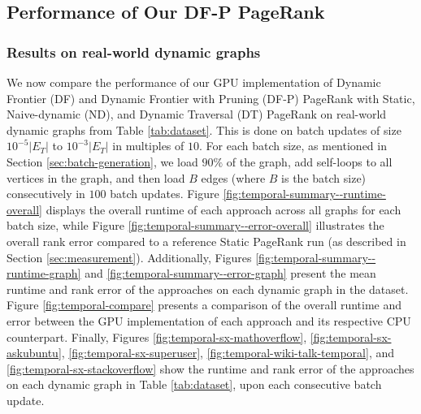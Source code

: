 \subsection{Performance of Our DF-P PageRank}

\subsubsection{Results on real-world dynamic graphs}

We now compare the performance of our GPU implementation of Dynamic Frontier (DF) and Dynamic Frontier with Pruning (DF-P) PageRank with Static, Naive-dynamic (ND), and Dynamic Traversal (DT) PageRank on real-world dynamic graphs from Table \ref{tab:dataset}. This is done on batch updates of size $10^{-5}|E_T|$ to $10^{-3}|E_T|$ in multiples of $10$. For each batch size, as mentioned in Section \ref{sec:batch-generation}, we load $90\%$ of the graph, add self-loops to all vertices in the graph, and then load $B$ edges (where $B$ is the batch size) consecutively in $100$ batch updates. Figure \ref{fig:temporal-summary--runtime-overall} displays the overall runtime of each approach across all graphs for each batch size, while Figure \ref{fig:temporal-summary--error-overall} illustrates the overall rank error compared to a reference Static PageRank run (as described in Section \ref{sec:measurement}). Additionally, Figures \ref{fig:temporal-summary--runtime-graph} and \ref{fig:temporal-summary--error-graph} present the mean runtime and rank error of the approaches on each dynamic graph in the dataset. Figure \ref{fig:temporal-compare} presents a comparison of the overall runtime and error between the GPU implementation of each approach and its respective CPU counterpart. Finally, Figures \ref{fig:temporal-sx-mathoverflow}, \ref{fig:temporal-sx-askubuntu}, \ref{fig:temporal-sx-superuser}, \ref{fig:temporal-wiki-talk-temporal}, and \ref{fig:temporal-sx-stackoverflow} show the runtime and rank error of the approaches on each dynamic graph in Table \ref{tab:dataset}, upon each consecutive batch update.





